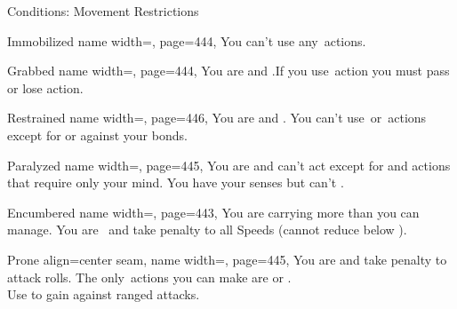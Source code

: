 \begin{PageFront}
\begin{Tables}{\frontTableHeight}
\begin{Table}{Conditions: Movement Restrictions}
            \begin{entry}{Immobilized}{%
                name width=\conditionLength,%
                page=444,
            }
                You can't use any \Move\,actions.\hfill
            \end{entry}
            \begin{entry}{Grabbed}{%
                name width=\conditionLength,%
                page=444,
            }
                You are \OffGuard and \Immobilized.\hfill If you use \Manipulate\,action you must pass \Flat[][val=5] or lose action.
            \end{entry}
            \begin{entry}{Restrained}{%
                name width=\conditionLength,%
                page=446,
            }
                You are \OffGuard and \Immobilized.
                You can't use \Attack\,or \Manipulate\,actions except for  or  against your bonds. \hfill
            \end{entry}
            \begin{entry}{Paralyzed}{%
                name width=\conditionLength,%
                page=445,
            }
                You are \OffGuard and can't act except for  and actions that require only your mind.\hfill
                You have your senses but can't .
            \end{entry}
            \breakLine
            \begin{entry}{Encumbered}{%
                name width=\conditionLength,%
                page=443,
            }
                You are carrying more than you can manage. \hfill
                You are \Clumsy\, and take  penalty to all Speeds {(cannot reduce below  \Feet)}.
            \end{entry}
            \begin{entry}{Prone}{%
                align=center seam,
                name width=\conditionLength,%
                page=445,
            }
                You are \OffGuard and take  \Cirm penalty to attack rolls. \hfill
                The only \Move\,actions you can make are  or .\\
                Use  to gain \GCover against ranged attacks. \hfill

\end{entry}
\end{Table}
\end{Tables}
\end{PageFront}
